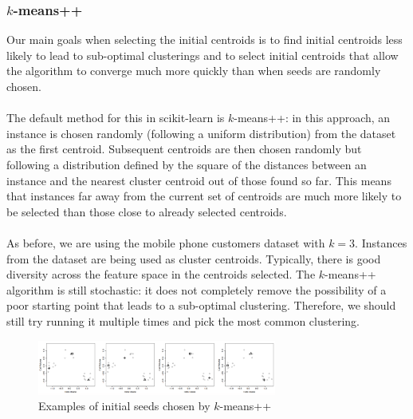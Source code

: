 \documentclass[a4paper,11pt]{article}
\begin{document}
\subsubsection{$k$-means++}
Our main goals when selecting the initial centroids is to find initial centroids less likely to lead to sub-optimal clusterings and to select initial centroids that allow the algorithm to converge much more quickly than when seeds are randomly chosen.
\\\\
The default method for this in scikit-learn is $k$-means++:
in this approach, an instance is chosen randomly (following a uniform distribution) from the dataset as the first centroid.
Subsequent centroids are then chosen randomly but following a distribution defined by the square of the distances between an instance and the nearest cluster centroid out of those found so far.
This means that instances far away from the current set of centroids are much more likely to be selected than those close to already selected centroids.
\\\\
As before, we are using the mobile phone customers dataset with $k = 3$.
Instances from the dataset are being used as cluster centroids.
Typically, there is good diversity across the feature space in the centroids selected.
The $k$-means++ algorithm is still stochastic: it does not completely remove the possibility of a poor starting point that leads to a sub-optimal clustering.
Therefore, we should still try running it multiple times and pick the most common clustering.

\begin{figure}[H]
    \centering
    \includegraphics[width=0.7\textwidth]{images/kplusplusseeds.png}
    \caption{ Examples of initial seeds chosen by $k$-means++ }
\end{figure}
\end{document}
